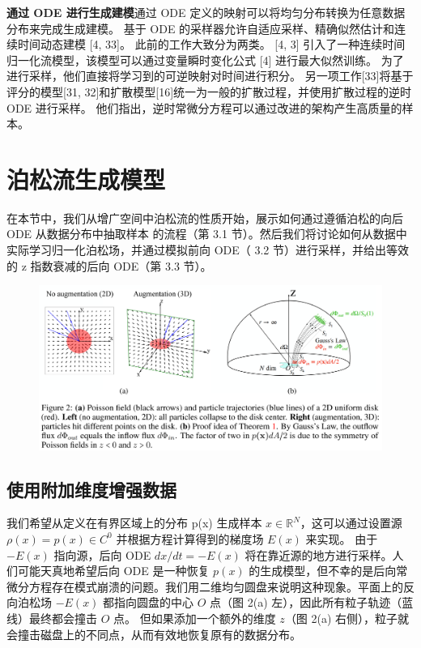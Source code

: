\documentclass[hyperref,UTF-8]{ctexart}
\newcommand{\R}{\mathbb{R}}
\newcommand{\0}{\boldsymbol{0}}
\begin{document}
\textbf{通过 ODE 进行生成建模}\quad 通过 ODE 定义的映射可以将均匀分布转换为任意数据分布来完成生成建模。 基于 ODE 的采样器允许自适应采样、精确似然估计和连续时间动态建模 [4, 33]。 此前的工作大致分为两类。 [4, 3] 引入了一种连续时间归一化流模型，该模型可以通过变量瞬时变化公式 [4] 进行最大似然训练。 为了进行采样，他们直接将学习到的可逆映射对时间进行积分。 另一项工作[33]将基于评分的模型[31, 32]和扩散模型[16]统一为一般的扩散过程，并使用扩散过程的逆时 ODE 进行采样。 他们指出，逆时常微分方程可以通过改进的架构产生高质量的样本。

\section{泊松流生成模型}

在本节中，我们从增广空间中泊松流的性质开始，展示如何通过遵循泊松的向后 ODE 从数据分布中抽取样本
的流程（第 3.1 节）。然后我们将讨论如何从数据中实际学习归一化泊松场，并通过模拟前向 ODE（ 3.2 节）进行采样，并给出等效的 z 指数衰减的后向 ODE（第 3.3 节）。

\begin{figure}[ht]
  \centering
  \includegraphics[width=1\textwidth]{img/figure2.png}
\end{figure}

\subsection{使用附加维度增强数据}

我们希望从定义在有界区域上的分布 p(x) 生成样本 $x \in \R ^N$，这可以通过设置源 $\rho(x) = p(x) \in C^0$ 并根据方程计算得到的梯度场 $E(x)$ 来实现。 由于 $−E(x)$ 指向源，后向 ODE $dx/dt = -E(x)$ 将在靠近源的地方进行采样。人们可能天真地希望后向 ODE 是一种恢复 $p(x)$ 的生成模型，但不幸的是后向常微分方程存在模式崩溃的问题。我们用二维均匀圆盘来说明这种现象。平面上的反向泊松场 $-E(x)$ 都指向圆盘的中心 $O$ 点（图 2(a) 左），因此所有粒子轨迹（蓝线）最终都会撞击 $O$ 点。 但如果添加一个额外的维度 $z$（图 2(a) 右侧），粒子就会撞击磁盘上的不同点，从而有效地恢复原有的数据分布。
\end{document}
